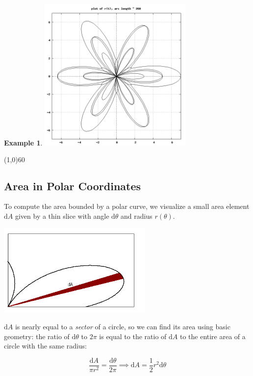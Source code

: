 \documentclass[10.5pt,twoside]{report}
\theoremstyle{definition}
\newtheorem{exmp}{Example}[section]
\begin{document}
\begin{exmp}
\includegraphics[width=3in]{example_5_4_2_1}

\end{exmp}

\line(1,0){60}
\linethickness{0.5mm}
\pagebreak

\subsection{Area in Polar Coordinates}

To compute the area bounded by a polar curve, we visualize a small area element $\mathrm{d}A$ given by a thin slice with angle $\mathrm{d}\theta$ and radius $r(\theta)$.  \\

\begin{center}
\includegraphics[width=3in]{figure_5_4_3_1}
\end{center}


$\mathrm{d}A$ is nearly equal to a \textit{sector} of a circle, so we can find its area using basic geometry: the ratio of $\mathrm{d}\theta$ to $2\pi$ is equal to the ratio of $\mathrm{d}A$ to the entire area of a circle with the same radius:

\[\frac{\mathrm{d}A}{\pi r^2}=\frac{\mathrm{d}\theta}{2\pi} \implies
\mathrm{d}A=\frac{1}{2}r^2 \mathrm{d}\theta \]

${}$\\
\end{document}
